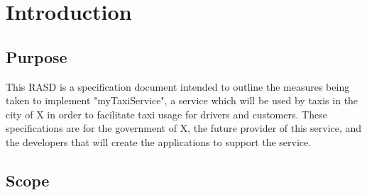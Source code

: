 	\section{Introduction}

\subsection{Purpose}
	This RASD is a specification document intended to outline the measures being taken to implement "myTaxiService", a service which will be used
	by taxis in the city of X in order to facilitate taxi usage for drivers and customers. These specifications are for the government of X, the
	future provider of this service, and the developers that will create the applications to support the service.
\subsection{Scope}
